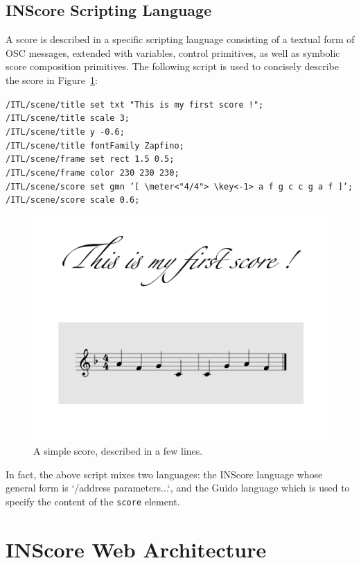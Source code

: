 \documentclass{article}
\newcommand{\icode}[1]	{{\small \texttt{#1}}}
\newcommand{\code}[1]	{\vspace{-1em}\begin{center}\colorbox{mygrey}{\begin{minipage}[t]{0.98\columnwidth} {\scriptsize \texttt{#1}}\end{minipage}}\end{center}}
\begin{document}
\subsection{INScore Scripting Language}
A score is described in a specific scripting language consisting of a textual form of OSC messages, extended with variables, control primitives, as well as symbolic score composition primitives. The following script is used to concisely describe the score in Figure~\ref{fig:score}:
\code{/ITL/scene/title set txt "This is my first score !"; \\
/ITL/scene/title scale 3;\\
/ITL/scene/title y -0.6;\\
/ITL/scene/title fontFamily Zapfino;\\
/ITL/scene/frame set rect 1.5 0.5;\\
/ITL/scene/frame color 230 230 230;\\
/ITL/scene/score set gmn 
   '[ \textbackslash meter<"4/4"> \textbackslash key<-1> a f g c c g a f ]';\\
/ITL/scene/score scale 0.6;}

\begin{figure}[h]
\centering
\includegraphics[width=0.7\columnwidth]{rsrc/inscore-exemple.png}
\caption{A simple score, described in a few lines.}
\label{fig:score}
\end{figure}
In fact, the above script mixes two languages: the INScore language whose general form is `/address parameters...`, and the Guido language \cite{hoos98} which is used to specify the content of the \icode{score} element.

\section{INScore Web Architecture}\label{sec:arch}
\end{document}

